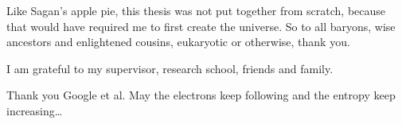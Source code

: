  
 







\begin{acknowledgements}
\addchaptertocentry{\acknowledgementname} %
\vspace{0.4cm}
\begingroup
\normalsize
Like Sagan's apple pie, this thesis was not put together from scratch, because that would have required me to first create the universe. So to all baryons, wise ancestors and enlightened cousins, eukaryotic or otherwise, thank you.

I am grateful to my supervisor, research school, friends and family.

Thank you Google et al. May the electrons keep following and the entropy keep increasing\dots
\endgroup
\end{acknowledgements}

